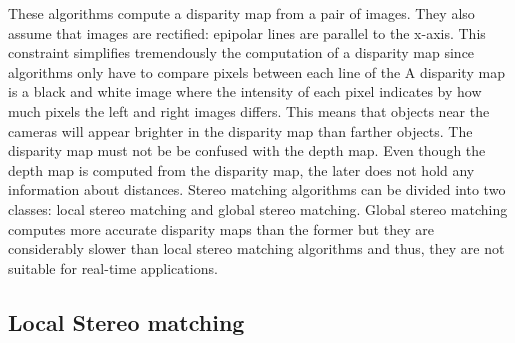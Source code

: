 \documentclass[11pt]{report}
\begin{document}
These algorithms compute a disparity map from a pair of images. They also assume that images are rectified: epipolar lines are parallel to the x-axis. This constraint simplifies tremendously the computation of a disparity map since algorithms only have to compare pixels between each line of the  A disparity map is a black and white image where the intensity of each pixel indicates by how much pixels the left and right images differs. This means that objects near the cameras will appear brighter in the disparity map than farther objects. The disparity map must not be be confused with the depth map. Even though the depth map is computed from the disparity map, the later does not hold any information about distances.
Stereo matching algorithms can be divided into two classes: local stereo matching and global stereo matching. Global stereo matching computes more accurate disparity maps than the former but they are considerably slower than local stereo matching algorithms and thus, they are not suitable for real-time applications.

\subsection{Local Stereo matching}
\end{document}
